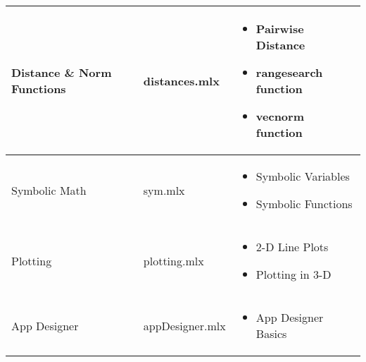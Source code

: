 \documentclass[../CourseManual.tex]{subfiles}
\begin{document}
\begin{table}[H]
\begin{tabular}{|m{4.5cm}|p{3cm}|m{8cm}|}
         Distance \& Norm Functions & distances.mlx & 
         \begin{itemize}[leftmargin=*]
         \setlength\itemsep{0.02em}
             \item Pairwise Distance 
             \item rangesearch function
             \item vecnorm function
         \end{itemize}\\
         \hline
         
         Symbolic Math & sym.mlx & 
         \begin{itemize}[leftmargin=*]
         \setlength\itemsep{0.02em}
             \item Symbolic Variables
             \item Symbolic Functions
         \end{itemize}\\
         \hline
         
         Plotting & plotting.mlx & 
         \begin{itemize}[leftmargin=*]
         \setlength\itemsep{0.02em}
             \item 2-D Line Plots
             \item Plotting in 3-D
         \end{itemize}\\
         \hline
         
         App Designer & appDesigner.mlx & 
         \begin{itemize}[leftmargin=*]
         \setlength\itemsep{0.02em}
             \item App Designer Basics
         \end{itemize}\\
         \hline
    \end{tabular}
    \label{tab:MATLAB Primer}
\end{table}
\end{document}
